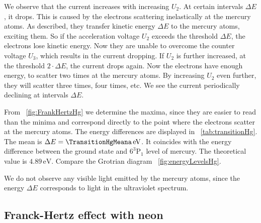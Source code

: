 \documentclass[a4paper,10pt,twocolumn]{article}
\newcommand{\eV}{\, \mathrm{eV}}
\newcommand{\HgLevelA}{6^3\mathrm{P}_1}
\newcommand{\TheoreticalTransitionHga}{4.89}
\begin{document}
    We observe that the current increases with increasing $U_2$.
    At certain intervals $\Delta E$, it drops.
    This is caused by the electrons scattering inelastically at the mercury atoms.
    As described, they transfer kinetic energy $\Delta E$ to the mercury atoms, exciting them.
    So if the acceleration voltage $U_2$ exceeds the threshold $\Delta E$, the electrons lose kinetic energy.
    Now they are unable to overcome the counter voltage $U_3$, which results in the current dropping.
    If $U_2$ is further increased, at the threshold $2 \cdot \Delta E$, the current drops again.
    Now the electrons have enough energy, to scatter two times at the mercury atoms.
    By increasing $U_2$ even further, they will scatter three times, four times, etc.
    We see the current periodically declining at intervals $\Delta E$.
    
    
    From ~\autoref{fig:FrankHertzHg} we determine the maxima, since they are easier to read than the minima and
    correspond directly to the point where the electrons scatter at the mercury atoms.
    The energy differences are displayed in ~\autoref{tab:transitionHg}.
    The mean is $\Delta E = \TransitionHgMeana \eV$.
    It coincides with the energy difference between the ground state and $\HgLevelA$ level
    of mercury.
    The theoretical value is $\TheoreticalTransitionHga \eV$.
    Compare the Grotrian diagram ~\autoref{fig:energyLevelsHg}.
    
    We do not observe any visible light emitted by the mercury atoms, since the energy $\Delta E$ corresponds to light in the
    ultraviolet spectrum.
    
    
    \subsection{Franck-Hertz effect with neon}
    
\end{document}
